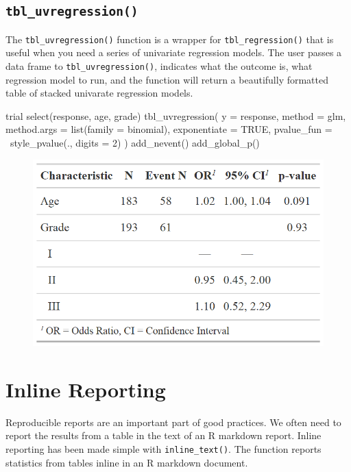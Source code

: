 \subsection{\texorpdfstring{\texttt{tbl\_uvregression()}}{tbl\_uvregression()}}

The \texttt{tbl\_uvregression()} function is a wrapper for \texttt{tbl\_regression()} that is useful when you need a series of univariate regression models.
The user passes a data frame to \texttt{tbl\_uvregression()}, indicates what the outcome is, what regression model to run, and the function will return a beautifully formatted table of stacked univarate regression models.

\begin{example}
trial %
  select(response, age, grade) %
  tbl_uvregression(
    y = response, 
    method = glm,
    method.args = list(family = binomial),
    exponentiate = TRUE,
    pvalue_fun = ~style_pvalue(., digits = 2)
  ) %
  add_nevent() %
  add_global_p()
\end{example}

\begin{figure}[h!]
  \includegraphics[scale=0.28]{uvregression.png}
  \centering
\end{figure}

\section{Inline Reporting}

Reproducible reports are an important part of good practices.
We often need to report the results from a table in the text of an R markdown report.
Inline reporting has been made simple with \texttt{inline\_text()}.
The function reports statistics from  tables inline in an R markdown document.


